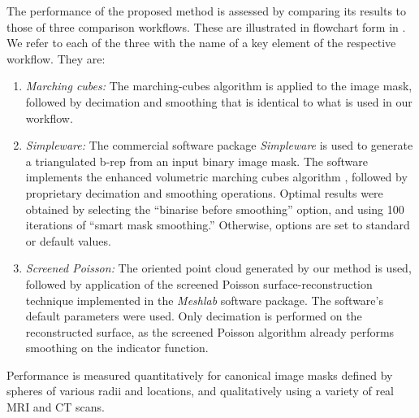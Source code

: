 The performance of the proposed method is assessed by comparing its results to those of three comparison workflows.  These are illustrated in flowchart form in .  We refer to each of the three with the name of a key element of the respective workflow.  They are:
\begin{enumerate}
\item  {\em Marching cubes:}  The marching-cubes algorithm is applied to the image mask, followed by decimation and smoothing that is identical to what is used in our workflow.
\item  {\em Simpleware:}  The commercial software package {\em Simpleware} is used to generate a triangulated b-rep from an input binary image mask.  The software implements the enhanced volumetric marching cubes algorithm \cite{young_2008}, followed by proprietary decimation and smoothing operations.  Optimal results were obtained by selecting the ``binarise before smoothing'' option, and using 100 iterations of ``smart mask smoothing.''  Otherwise, options are set to standard or default values.
\item  {\em Screened Poisson:}  The oriented point cloud generated by our method is used, followed by application of the screened Poisson surface-reconstruction technique \cite{kazhdan_2013} implemented in the \textit{Meshlab} software package.  The software's default parameters were used.  Only decimation is performed on the reconstructed surface, as the screened Poisson algorithm already performs smoothing on the indicator function.  
\end{enumerate}
Performance is measured quantitatively for canonical image masks defined by spheres of various radii and locations, and qualitatively using a variety of real MRI and CT scans.
